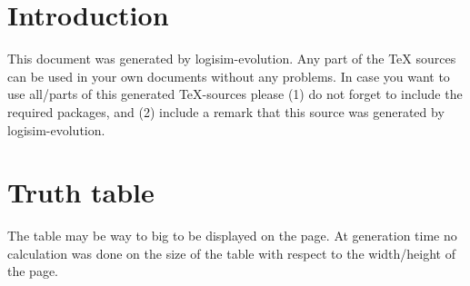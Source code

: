 \documentclass [15pt,a4paper,twoside]{article}
\begin{document}
\section{Introduction}
This document was generated by logisim-evolution. Any part of the TeX sources can be used in your own documents without any problems. In case you want to use all/parts of this generated TeX-sources please (1) do not forget to include the required packages, and (2) include a remark that this source was generated by logisim-evolution.
\section{Truth table}
The table may be way to big to be displayed on the page. At generation time no calculation was done on the size of the table with respect to the width/height of the page.
\end{document}
